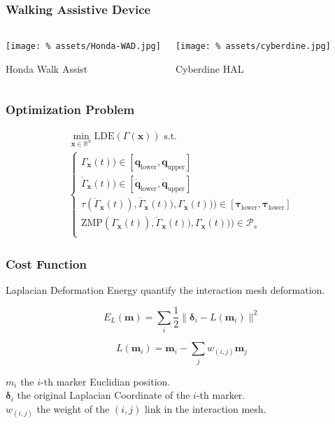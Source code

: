 
\begin{frame}[noframenumbering]
  \frametitle{Walking Assistive Device}

  \begin{columns}
    \column{.45\paperwidth}
    \begin{center}
      \texttt{[image: \%
        assets/Honda-WAD.jpg]}
      \par
      Honda Walk Assist
    \end{center}
    \column{.45\paperwidth}
    \begin{center}
      \texttt{[image: \%
        assets/cyberdine.jpg]}
      \par
      Cyberdine HAL
    \end{center}
  \end{columns}
\end{frame}

\begin{frame}
  \frametitle{Optimization Problem}

  \begin{multline}
    \min_{\mathbf{x} \in \mathbb{R}^n} \text{LDE}(\Gamma(\mathbf{x})) \text{ s.t. }\\
    \begin{cases}
      \Gamma_{\mathbf{x}}(t))
      \in [\mathbf{q}_{\text{lower}}, \mathbf{q}_{\text{upper}}]\\
      \dot{\Gamma}_{\mathbf{x}}(t))
      \in [\dot{\mathbf{q}}_{\text{lower}}, \dot{\mathbf{q}}_{\text{upper}}]\\
      \tau(\ddot{\Gamma}_{\mathbf{x}}(t)),
      \dot{\Gamma}_{\mathbf{x}}(t)),\Gamma_{\mathbf{x}}(t)))
      \in [\mathbf{\tau}_{\text{lower}}, \mathbf{\tau}_{\text{lower}}]\\
      \text{ZMP}(\ddot{\Gamma}_{\mathbf{x}}(t)),
      \dot{\Gamma}_{\mathbf{x}}(t)),\Gamma_{\mathbf{x}}(t)))
      \in \mathcal{P}_s\\
    \end{cases}
  \end{multline}
\end{frame}


\begin{frame}
  \frametitle{Cost Function}

  \alert{Laplacian Deformation Energy} quantify the interaction mesh
  deformation.

  \begin{equation}
    E_L(\mathbf{m}) = \sum_i \frac{1}{2} \| \mathbf{\delta}_i - L(\mathbf{m}_i) \|^2
  \end{equation}

  \begin{equation}
    L(\mathbf{m}_i) = \mathbf{m}_i - \sum_j w_{(i,j)} \mathbf{m}_j
  \end{equation}

  $m_i$ the $i$-th marker Euclidian position.\\
  $\mathbf{\delta}_i$ the original Laplacian Coordinate of the $i$-th marker.\\
  $w_{(i,j)}$ the weight of the $(i,j)$ link in the interaction mesh.
\end{frame}



